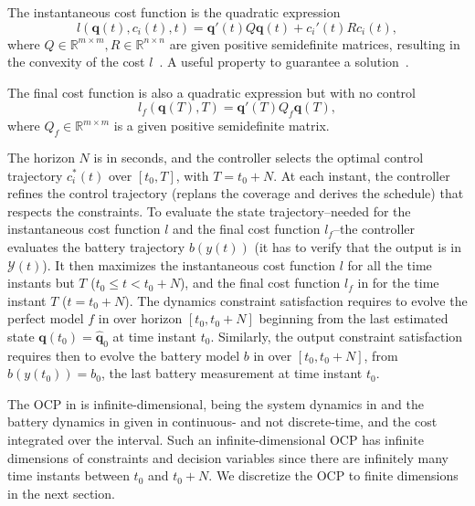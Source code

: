 The instantaneous cost function is the quadratic expression
\begin{equation}\label{eq:insta-cost-mpc}
  l(\mathbf{q}(t),c_i(t),t)=\mathbf{q}'(t)Q\mathbf{q}(t)+c_i'(t)Rc_i(t),
\end{equation}
where $Q\in\mathbb{R}^{m\times m},R\in\mathbb{R}^{n\times n}$ are given positive semidefinite matrices, resulting in the convexity of the cost $l$~\citep{nocedal2006numerical}. A useful property to guarantee a solution~\citep{beck2014introduction}.

The final cost function is also a quadratic expression but with no control~\citep{rawlings2017model}
\begin{equation}\label{eq:final-cost-mpc}
  l_f(\mathbf{q}(T),T)=\mathbf{q}'(T)Q_f\mathbf{q}(T),
\end{equation}
where $Q_f\in\mathbb{R}^{m\times m}$ is a given positive semidefinite matrix.

The horizon $N$ is in seconds, and the controller selects the optimal control trajectory $c_i^*(t)$ over $[t_0,T]$, with $T=t_0+N$. At each instant, the controller refines the control trajectory (replans the coverage and derives the schedule) that respects the constraints. To evaluate the state trajectory--needed for the instantaneous cost function $l$ and the final cost function $l_f$--the controller evaluates the battery trajectory $b(y(t))$ (it has to verify that the output is in $\mathcal{Y}(t)$). It then maximizes the instantaneous cost function $l$ for all the time instants but $T$ ($t_0\leq t < t_0+N$), and the final cost function $l_f$ in  for the time instant $T$ ($t=t_0+N$).
The dynamics constraint satisfaction requires to evolve the perfect model $f$ in  over horizon $[t_0,t_0+N]$ beginning from the last estimated state $\mathbf{q}(t_0)=\hat{\mathbf{q}}_0$ at time instant $t_0$. Similarly, the output constraint satisfaction requires then to evolve the battery model $b$ in  over $[t_0,t_0+N]$, from $b(y(t_0))=b_0$, the last battery measurement at time instant $t_0$.

The OCP in  is infinite-dimensional, being the system dynamics in  and the battery dynamics in  given in continuous- and not discrete-time, and the cost integrated over the interval. Such an infinite-dimensional OCP has infinite dimensions of constraints and decision variables since there are infinitely many time instants between $t_0$ and $t_0+N$. We discretize the OCP to finite dimensions in the next section.

